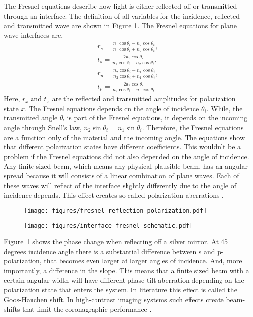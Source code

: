 \documentclass[letterpaper]{ar-1col}
\begin{document}
The Fresnel equations describe how light is either reflected off or transmitted through an interface. The definition of all variables for the incidence, reflected and transmitted wave are shown in Figure \ref{fig:fresnel_equations}. The Fresnel equations for plane wave interfaces are,
\begin{align}
r_s = \frac{n_1\cos{\theta_i} - n_2\cos{\theta_t}}{n_1\cos{\theta_i} + n_2\cos{\theta_t}},\\
t_s = \frac{2n_1 \cos{\theta_i}}{n_1\cos{\theta_i} + n_2\cos{\theta_t}},\\
r_p = \frac{n_2\cos{\theta_i} - n_1\cos{\theta_t}}{n_2\cos{\theta_i} + n_1\cos{\theta_t}},\\
t_p = \frac{2n_1 \cos{\theta_i}}{n_2\cos{\theta_i} + n_1\cos{\theta_t}}
\end{align}
Here, $r_x$ and $t_x$ are the reflected and transmitted amplitudes for polarization state $x$. The Fresnel equations depends on the angle of incidence $\theta_i$. While, the transmitted angle $\theta_t$ is part of the Fresnel equations, it depends on the incoming angle through Snell's law, $n_2 \sin \theta_t = n_1 \sin \theta_i$. Therefore, the Fresnel equations are a function only of the material and the incoming angle. The equations show that different polarization states have different coefficients. This wouldn't be a problem if the Fresnel equations did not also depended on the angle of incidence. Any finite-sized beam, which means any physical plausible beam, has an angular spread because it will consists of a linear combination of plane waves. Each of these waves will reflect of the interface slightly differently due to the angle of incidence depends. This effect creates so called polarization aberrations \citep{Chipman89, Breckinridge15}.

\begin{figure}[ht]
  \centering
  \texttt{[image: figures/fresnel\_reflection\_polarization.pdf]}
  \caption{}
  \label{fig:fresnel_equations}
\end{figure}

\begin{figure}[ht]
  \centering
  \texttt{[image: figures/interface\_fresnel\_schematic.pdf]}
  \caption{}
  \label{fig:fresnel_interface}
\end{figure}

Figure~\ref{fig:fresnel_equations} shows the phase change when reflecting off a silver mirror. At 45 degrees incidence angle there is a substantial difference between s and p-polarization, that becomes even larger at larger angles of incidence. And, more importantly, a difference in the slope. This means that a finite sized beam with a certain angular width will have different phase tilt aberration depending on the polarization state that enters the system. In literature this effect is called the Goos-Hanchen shift. In high-contrast imaging systems such effects create beam-shifts that limit the coronagraphic performance \citep{Schmid18, millar2022polarization}.
\end{document}
